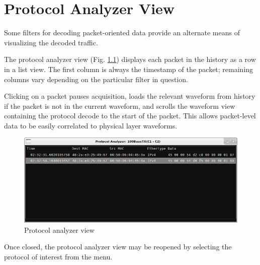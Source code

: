 \chapter{Protocol Analyzer View}

Some filters for decoding packet-oriented data provide an alternate means of visualizing the decoded traffic.

The protocol analyzer view (Fig. \ref{proto-analyzer}) displays each packet in the history as a row in a list view. The
first column is always the timestamp of the packet; remaining columns vary depending on the particular filter in
question.

Clicking on a packet pauses acquisition, loads the relevant waveform from history if the packet is not in the current
waveform, and scrolls the waveform view containing the protocol decode to the start of the packet. This allows
packet-level data to be easily correlated to physical layer waveforms.

\begin{figure}[H]
\centering
\includegraphics[width=14cm]{images/proto-analyzer.png}
\caption{Protocol analyzer view}
\label{proto-analyzer}
\end{figure}

Once closed, the protocol analyzer view may be reopened by selecting the protocol of interest from the
 menu.
